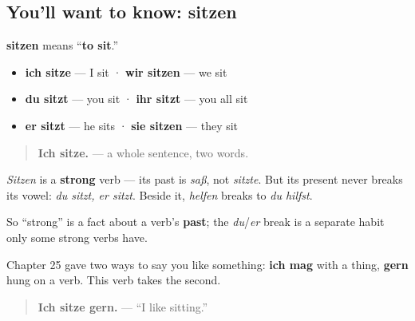 \subsection*{You'll want to know: sitzen}
\textbf{sitzen} means \textquotedblleft{}\textbf{to sit}.\textquotedblright{}

\begin{itemize}
\raggedright
  \item \textbf{ich sitze} — I sit · \textbf{wir sitzen} — we sit
  \item \textbf{du sitzt} — you sit · \textbf{ihr sitzt} — you all sit
  \item \textbf{er sitzt} — he sits · \textbf{sie sitzen} — they sit
\end{itemize}

\begin{quote}
\textbf{Ich sitze.} — a whole sentence, two words.
\end{quote}

\begin{grammarlens}[title={Grammar Lens: strong does not mean it breaks}]
\emph{Sitzen} is a \textbf{strong} verb — its past is \emph{saß}, not \emph{sitzte}. But its present never breaks its vowel: \emph{du sitzt, er sitzt}. Beside it, \emph{helfen} breaks to \emph{du hilfst}.

So \textquotedblleft{}strong\textquotedblright{} is a fact about a verb's \textbf{past}; the \emph{du}/\emph{er} break is a separate habit only some strong verbs have.

Chapter 25 gave two ways to say you like something: \textbf{ich mag} with a thing, \textbf{gern} hung on a verb. This verb takes the second.

\begin{quote}
\textbf{Ich sitze gern.} — \textquotedblleft{}I like sitting.\textquotedblright{}
\end{quote}
\end{grammarlens}

